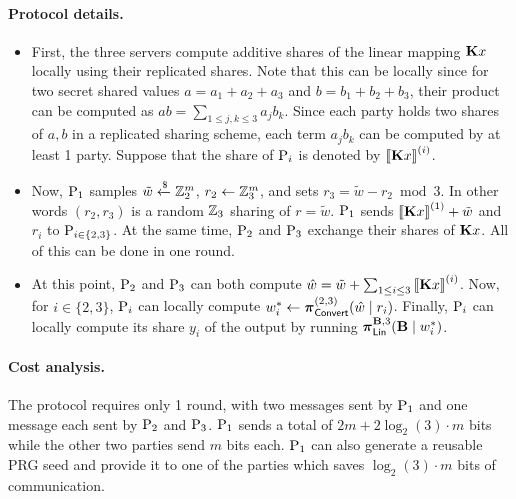 \paragraph{Protocol details.}
\begin{itemize}
  \item First, the three servers compute additive shares of the linear mapping $\mat{K}{x}$ locally using their replicated shares. Note that this can be locally since for two secret shared values $a = a_1 + a_2 + a_3$ and $b = b_1 + b_2 + b_3$, their product can be computed as $ab = \sum_{1 \leq j,k \leq 3} a_jb_k$. Since each party holds two shares of $a,b$ in a replicated sharing scheme, each term $a_jb_k$ can be computed by at least 1 party. Suppose that the share of $\textnormal{P}_i$ is denoted by $\sharei{\mat{K}x}$.

  \item Now, $\textnormal{P}_1$ samples $\tilde{w} \xleftarrow{\$} \mathbb{Z}_2^m$, $r_2 \gets \mathbb{Z}_3^m$, and sets $r_3 = \tilde{w} - r_2 \bmod 3$. In other words $(r_2, r_3)$ is a random $\mathbb{Z}_3$ sharing of $r = \tilde{w}$. $\textnormal{P}_1$ sends $\share{\mat{K}x}^{(1)} + \tilde{w}$ and $r_i$ to $\textnormal{P}_{i \in \{2,3\}}$. At the same time, $\textnormal{P}_2$ and $\textnormal{P}_3$ exchange their shares of $\mat{K}x$. All of this can be done in one round.

  \item At this point, $\textnormal{P}_2$ and $\textnormal{P}_3$ can both compute $\hat{w} = \tilde{w} + \sum_{1\leq i \leq 3} \sharei{\mat{K}x}$. Now, for $i \in \{2,3\}$, $\textnormal{P}_i$ can locally compute $w^*_i \gets \boldsymbol{\pi}_{\textnormal{\textsf{Convert}}}^{(2,3)}(\hat{w} \mid r_i)$. Finally, $\textnormal{P}_i$ can locally compute its share $y_i$ of the output by running $\prot_\LMap^{\mat{B},3}(\mat{B} \mid w^*_i)$.
\end{itemize}


\paragraph{Cost analysis.}
The protocol requires only 1 round, with two messages sent by $\textnormal{P}_1$ and one message each sent by $\textnormal{P}_2$ and $\textnormal{P}_3$. $\textnormal{P}_1$ sends a total of $2m + 2 \log_2(3)\cdot m$ bits while the other two parties send $m$ bits each. $\textnormal{P}_1$ can also generate a reusable PRG seed and provide it to one of the parties which saves $\log_2(3)\cdot m$ bits of communication.  

\fi






